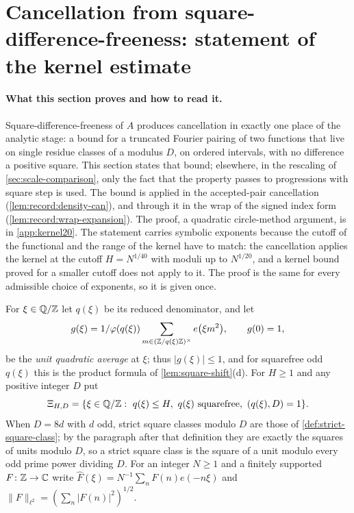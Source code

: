 \section{Cancellation from square-difference-freeness: statement of the kernel estimate}\label{sec:kernel}

\paragraph{What this section proves and how to read it.}
Square-difference-freeness of $A$ produces cancellation in exactly one place
of the analytic stage: a bound for a truncated Fourier pairing of two functions
that live on single residue classes of a modulus $D$, on ordered intervals,
with no difference a positive square. This section states that bound;
elsewhere, in the rescaling of \cref{sec:scale-comparison}, only the fact that
the property passes to progressions with square step is used. The bound is
applied in
the accepted-pair cancellation (\cref{lem:record:density-can}), and through it
in the wrap of the signed index form (\cref{lem:record:wrap-expansion}). The
proof, a quadratic circle-method argument, is in \cref{app:kernel20}. The
statement carries symbolic exponents because the cutoff of the functional and
the range of the kernel have to match: the cancellation applies the kernel at
the cutoff $H=N^{1/40}$ with moduli up to $N^{1/20}$, and a kernel bound proved
for a smaller cutoff does not apply to it. The proof is the same for every
admissible choice of exponents, so it is given once.

\begin{definition}\label{def:kernel-notation}
For $\xi\in\mathbb Q/\mathbb Z$ let $q(\xi)$ be its reduced denominator, and let
\[
 g(\xi)=1/\varphi(q(\xi))\sum_{m\in(\mathbb Z/q(\xi)\mathbb Z)^\times}e\big(\xi m^2\big),
 \qquad g(0)=1,
\]
be the \emph{unit quadratic average} at $\xi$; thus $|g(\xi)|\le1$, and for
squarefree odd $q(\xi)$ this is the product formula of
\cref{lem:square-shift}(d). For $H\ge1$ and any positive integer $D$ put
\[
 \Xi_{H,D}=\{\xi\in\Q/\Z:\ q(\xi)\le H,\ q(\xi)\ \text{squarefree},\ (q(\xi),D)=1\}.
\]
When $D=8d$ with $d$ odd, strict square classes modulo $D$ are those of
\cref{def:strict-square-class};
by the paragraph after that definition they are exactly the squares of units
modulo $D$, so a strict square class is the square of a unit modulo every odd
prime power dividing $D$. For an integer $N\ge1$
and a finitely supported $F\colon\mathbb Z\to\mathbb C$ write
$\widehat F(\xi)=N^{-1}\sum_nF(n)e(-n\xi)$ and
$\|F\|_{\ell^2}=(\sum_n|F(n)|^2)^{1/2}$.
\end{definition}

